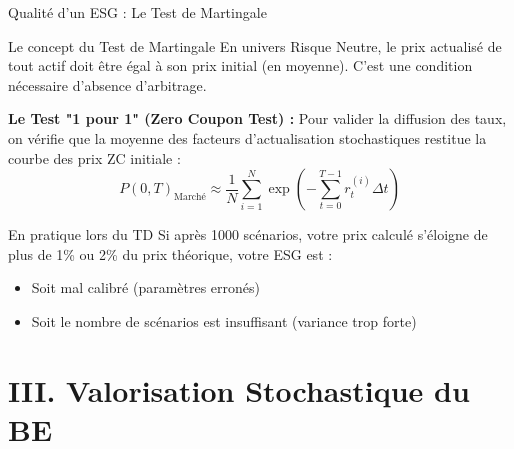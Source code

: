 \documentclass[10pt,aspectratio=169]{beamer}
\begin{document}
\begin{frame}{Qualité d'un ESG : Le Test de Martingale}
\begin{block}{Le concept du Test de Martingale}
En univers Risque Neutre, le prix actualisé de tout actif doit être égal à son prix initial (en moyenne). C'est une condition nécessaire d'absence d'arbitrage.
\end{block}

\vspace{0.3cm}
\textbf{Le Test "1 pour 1" (Zero Coupon Test) :}
Pour valider la diffusion des taux, on vérifie que la moyenne des facteurs d'actualisation stochastiques restitue la courbe des prix ZC initiale :
\[
P(0, T)_{\text{Marché}} \approx \frac{1}{N} \sum_{i=1}^{N} \exp\left(-\sum_{t=0}^{T-1} r_t^{(i)} \Delta t\right)
\]

\vspace{0.3cm}
\begin{exampleblock}{En pratique lors du TD}
Si après 1000 scénarios, votre prix calculé s'éloigne de plus de 1\% ou 2\% du prix théorique, votre ESG est :
\begin{itemize}
    \item Soit mal calibré (paramètres erronés)
    \item Soit le nombre de scénarios est insuffisant (variance trop forte)
\end{itemize}
\end{exampleblock}
\end{frame}

\section{III. Valorisation Stochastique du BE}
\end{document}
